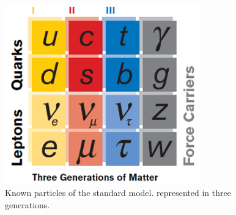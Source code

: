  \begin{figure}[htb]
  \begin{center}
    \includegraphics[width=240pt]{Figures/theory-standard-model-symmetry-mag.png}
  \end{center}
  \caption[Particles of the standard model]
	  {Known particles of the standard model. 
	    represented in three generations.
	  }
  \label{fig:StandardModel}
 \end{figure}


